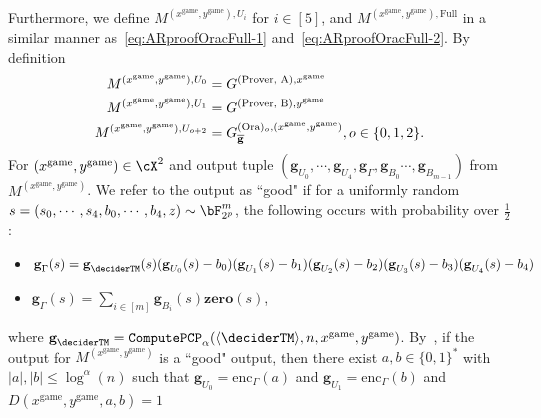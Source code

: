 Furthermore, we define $M^{(x^{\text{game}}, y^{\text{game}}), U_i}$ for $i \in [5]$, and $M^{(x^{\text{game}}, y^{\text{game}}), \text{Full}}$ in a similar manner as~\eqref{eq:ARproofOracFull-1} and~\eqref{eq:ARproofOracFull-2}. By definition
\begin{align*}
	M^{(x^{\text{game}}, y^{\text{game}}), U_0} &=  G^{(\text{Prover, A}), x^{\text{game}}} \\
	M^{(x^{\text{game}}, y^{\text{game}}), U_1} &=  G^{(\text{Prover, B}), y^{\text{game}}} \\
	M^{(x^{\text{game}}, y^{\text{game}}), U_{o+2}} &=  G_{\overline{\textbf{g}}}^{(\text{Ora})_{o}, (x^{\text{game}}, y^{\text{game}})}, o \in \{0,1,2\}.
\end{align*}
For $(x^{\text{game}}, y^{\text{game}}) \in \cX^2$ and output tuple $(\textbf{g}_{U_0}, \cdots, \textbf{g}_{U_4}, \textbf{g}_{\Gamma}, \textbf{g}_{B_0} \cdots,\textbf{g}_{B_{m-1}})$ from $M^{(x^{\text{game}}, y^{\text{game}})}$. We refer to the output as ``good" if for a uniformly random $s =(s_0, \cdots, s_4, b_0, \cdots, b_4, z) \sim \bF_{2^p}^m$, the following occurs with probability over $\frac{1}{2}$:
\begin{itemize}
	\item $\textbf{g}_{\Gamma}(s) = \textbf{g}_{\deciderTM}(s) (\textbf{g}_{U_0}(s) - b_0)  (\textbf{g}_{U_1}(s) - b_1)  (\textbf{g}_{U_2}(s) - b_2)  (\textbf{g}_{U_3}(s) - b_3)  (\textbf{g}_{U_4}(s) - b_4)$
	\item $\textbf{g}_{\Gamma}(s) = \sum_{i \in [m]} \textbf{g}_{B_i}(s) \textbf{zero}(s) $,
\end{itemize}
where $\textbf{g}_{\deciderTM} = \mathtt{ComputePCP}_{\alpha}(\langle \deciderTM \rangle ,n, x^{\text{game}}, y^{\text{game}})$. By~, if the output for $M^{(x^{\text{game}}, y^{\text{game}})}$ is a ``good" output, then there exist $a,b \in \{0,1\}^*$ with $|a|, |b|\leq \log^{\alpha}(n)$ such that $\textbf{g}_{U_0} =  \text{enc}_{\Gamma}(a)$ and $\textbf{g}_{U_1} =  \text{enc}_{\Gamma}(b)$ and $D(x^{\text{game}}, y^{\text{game}},a,b) =1$

